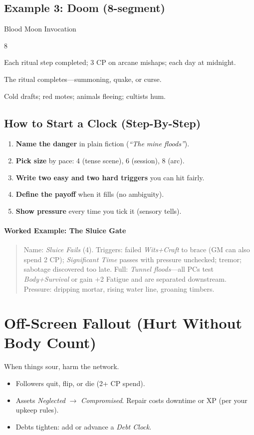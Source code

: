 \documentclass[12pt]{book}
\begin{document}
\subsection*{Example 3: Doom (8-segment)}
\begin{description}[leftmargin=2cm]
  \item[Name:] Blood Moon Invocation
  \item[Size:] 8
  \item[Fill Triggers:] Each ritual step completed; 3 CP on arcane mishaps; each day at midnight.
  \item[Full:] The ritual completes---summoning, quake, or curse.
  \item[Pressure:] Cold drafts; red motes; animals fleeing; cultists hum.
\end{description}

\subsection*{How to Start a Clock (Step-By-Step)}
\begin{enumerate}
  \item \textbf{Name the danger} in plain fiction (\emph{``The mine floods''}).
  \item \textbf{Pick size} by pace: 4 (tense scene), 6 (session), 8 (arc).
  \item \textbf{Write two easy and two hard triggers} you can hit fairly.
  \item \textbf{Define the payoff} when it fills (no ambiguity).
  \item \textbf{Show pressure} every time you tick it (sensory tells).
\end{enumerate}

\paragraph{Worked Example: The Sluice Gate}
\begin{quote}\small
Name: \emph{Sluice Fails} (4). Triggers: failed \emph{Wits+Craft} to brace (GM can also spend 2 CP); \emph{Significant Time} passes with pressure unchecked; tremor; sabotage discovered too late. Full: \emph{Tunnel floods}---all PCs test \emph{Body+Survival} or gain +2 Fatigue and are separated downstream. Pressure: dripping mortar, rising water line, groaning timbers.
\end{quote}

\section{Off-Screen Fallout (Hurt Without Body Count)}
When things sour, harm the network.
\begin{itemize}
  \item Followers quit, flip, or die (2+ CP spend).
  \item Assets \emph{Neglected} $\rightarrow$ \emph{Compromised}. Repair costs downtime or XP (per your upkeep rules).
  \item Debts tighten: add or advance a \emph{Debt Clock}.
\end{itemize}
\end{document}
